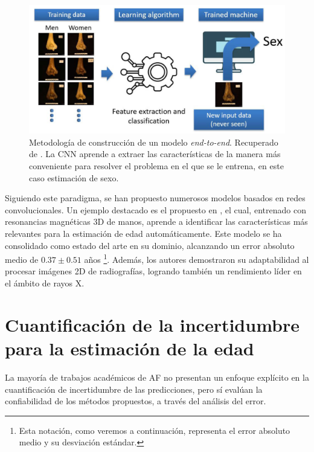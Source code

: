 \begin{figure}[htbp]
    \centering
    \includegraphics[width=\textwidth]{capitulos/cap_03/imagenes/end-to-end_learning.png}
    \caption[
        Metodología de construcción de un modelo \textit{end-to-end}. 
        Recuperado de \cite{venema2022}.
    ]{
        Metodología de construcción de un modelo \textit{end-to-end}. 
        Recuperado de \cite{venema2022}.
        La CNN aprende a extraer las características de la manera más conveniente para resolver el problema en el que se le entrena, en este caso estimación de sexo.
    }
    \label{fig:end-to-end_model}
\end{figure}

Siguiendo este paradigma, se han propuesto numerosos modelos basados en redes convolucionales. Un ejemplo destacado es el propuesto en \cite{stern2019}, el cual, entrenado con resonancias magnéticas 3D de manos, aprende a identificar las características más relevantes para la estimación de edad automáticamente. Este modelo se ha consolidado como estado del arte en su dominio, alcanzando un error absoluto medio de $0.37 \pm 0.51$ años%
\footnote{
    Esta notación, como veremos a continuación, representa el error absoluto medio y su desviación estándar.
}. 
Además, los autores demostraron su adaptabilidad al procesar imágenes 2D de radiografías, logrando también un rendimiento líder en el ámbito de rayos X.


\section{Cuantificación de la incertidumbre para la estimación de la edad}

La mayoría de trabajos académicos de AF no presentan un enfoque explícito en la cuantificación de incertidumbre de las predicciones, pero sí evalúan la confiabilidad de los métodos propuestos, a través del análisis del error. 

